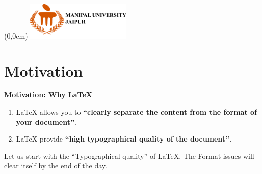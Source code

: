 \documentclass[xcolor=dvipsnames]{beamer}
\begin{document}
{
\begin{frame}
\begin{textblock*}{50cm}(0\textwidth,0cm)
\includegraphics[width=5cm]{fig/logofinal}
\end{textblock*}
\vspace{1.2cm}


  \titlepage
\end{frame}
}
\addtocounter{framenumber}{-1}

\section{Motivation}
\begin{frame}{\textbf{Motivation: Why \LaTeX{}}}
\begin{enumerate}
\item \LaTeX{} allows you to  \textbf{``clearly separate the content from the format of your document''}. \par
\vspace{0.4cm}

\par
\vspace{0.2cm}
\item \LaTeX{} provide  {\bf ``high typographical quality of the document''}.\par
\end{enumerate}
\vspace{0.4cm}
{\justifying Let us start with the ``Typographical quality'' of \LaTeX{}. The Format issues will clear itself by the end of the day.}

\end{frame}
\end{document}

